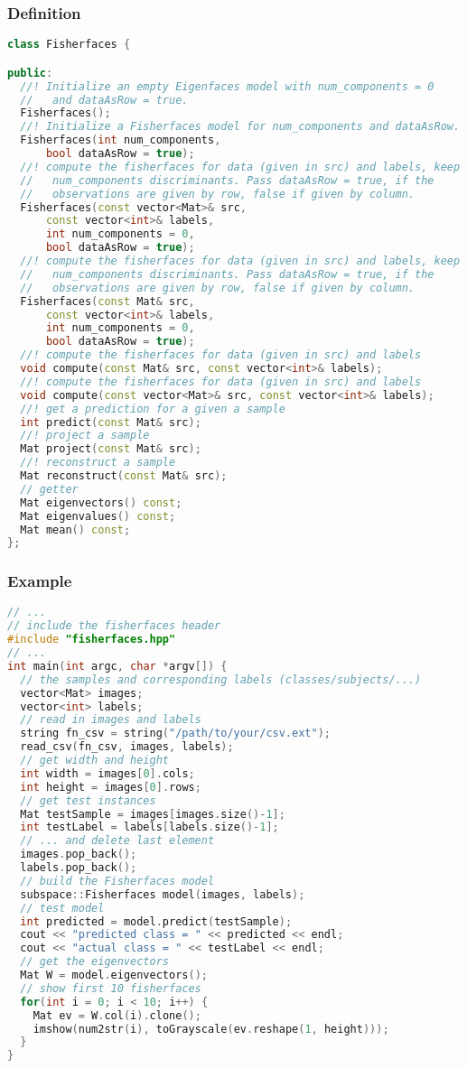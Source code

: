 \subsubsection{Definition}
\begin{lstlisting}[language=c++]
class Fisherfaces {

public:
  //! Initialize an empty Eigenfaces model with num_components = 0
  //   and dataAsRow = true.
  Fisherfaces();
  //! Initialize a Fisherfaces model for num_components and dataAsRow.
  Fisherfaces(int num_components, 
      bool dataAsRow = true);
  //! compute the fisherfaces for data (given in src) and labels, keep 
  //   num_components discriminants. Pass dataAsRow = true, if the 
  //   observations are given by row, false if given by column.
  Fisherfaces(const vector<Mat>& src, 
      const vector<int>& labels,
      int num_components = 0,
      bool dataAsRow = true);
  //! compute the fisherfaces for data (given in src) and labels, keep 
  //   num_components discriminants. Pass dataAsRow = true, if the 
  //   observations are given by row, false if given by column.
  Fisherfaces(const Mat& src,
      const vector<int>& labels,
      int num_components = 0,
      bool dataAsRow = true);
  //! compute the fisherfaces for data (given in src) and labels 
  void compute(const Mat& src, const vector<int>& labels);
  //! compute the fisherfaces for data (given in src) and labels 
  void compute(const vector<Mat>& src, const vector<int>& labels);
  //! get a prediction for a given a sample
  int predict(const Mat& src);
  //! project a sample
  Mat project(const Mat& src);
  //! reconstruct a sample
  Mat reconstruct(const Mat& src);
  // getter
  Mat eigenvectors() const;
  Mat eigenvalues() const;
  Mat mean() const;
};
\end{lstlisting}

\subsubsection{Example}
\begin{lstlisting}[language=c++]
// ...
// include the fisherfaces header
#include "fisherfaces.hpp"
// ...
int main(int argc, char *argv[]) {
  // the samples and corresponding labels (classes/subjects/...)
  vector<Mat> images;
  vector<int> labels;
  // read in images and labels
  string fn_csv = string("/path/to/your/csv.ext");
  read_csv(fn_csv, images, labels);
  // get width and height
  int width = images[0].cols;
  int height = images[0].rows;
  // get test instances
  Mat testSample = images[images.size()-1];
  int testLabel = labels[labels.size()-1];
  // ... and delete last element
  images.pop_back();
  labels.pop_back();
  // build the Fisherfaces model
  subspace::Fisherfaces model(images, labels);
  // test model
  int predicted = model.predict(testSample);
  cout << "predicted class = " << predicted << endl;
  cout << "actual class = " << testLabel << endl;
  // get the eigenvectors
  Mat W = model.eigenvectors();
  // show first 10 fisherfaces
  for(int i = 0; i < 10; i++) {
    Mat ev = W.col(i).clone();
    imshow(num2str(i), toGrayscale(ev.reshape(1, height)));
  }
}
\end{lstlisting}

